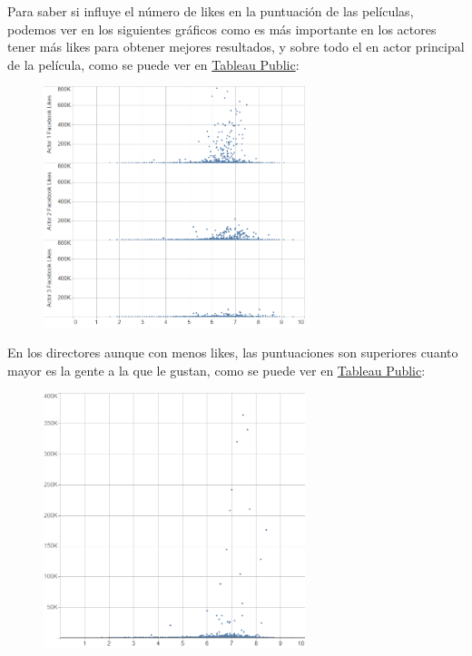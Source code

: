 \documentclass{article}
\begin{document}
\clearpage

Para saber si influye el número de likes en la puntuación de las películas, podemos ver en los siguientes gráficos como es más importante en los actores tener más likes para obtener mejores resultados, y sobre todo el en actor principal de la película, como se puede ver en \href{https://public.tableau.com/profile/javier6580\#!/vizhome/proyecto_fin_de_master_dataset/likes_actors_rating}{Tableau Public}:

\begin{figure}[h]
\centering
\includegraphics[width=3in,clip,keepaspectratio]{./images_latex/likes_actors_rating}
\end{figure}

En los directores aunque con menos likes, las puntuaciones son superiores cuanto mayor es la gente a la que le gustan, como se puede ver en \href{https://public.tableau.com/profile/javier6580\#!/vizhome/proyecto_fin_de_master_dataset/likes_director_rating}{Tableau Public}:

\begin{figure}[h]
\centering
\includegraphics[width=3in,clip,keepaspectratio]{./images_latex/likes_director_rating}
\end{figure}
\end{document}
